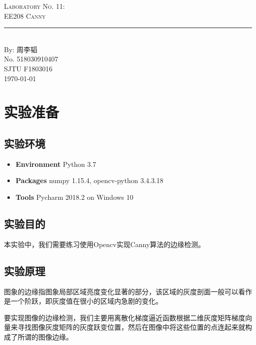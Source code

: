 \documentclass{article}
\newcommand{\labno}{11}
\newcommand{\labtitle}{EE208 Canny}
\newcommand{\authorname}{周李韬}
\newcommand{\studentno}{518030910407}
\newcommand{\classno}{F1803016}
\begin{document}
\begin{center}
{\LARGE \textsc{Laboratory No. \labno:} \\ \vspace{4pt}}
{\Large \textsc{\labtitle} \\ \vspace{4pt}} 
\rule[13pt]{\textwidth}{1pt} \\ \vspace{15pt}
{\large By: \authorname \\ \vspace{10pt}
No. \studentno \\ \vspace{10pt}
SJTU \classno \\ \vspace{10pt}
\today \vspace{20pt}}
\end{center}



\section{实验准备}

\subsection{实验环境}
\begin{itemize}
\item\textbf{Environment} Python 3.7
\item\textbf{Packages} numpy 1.15.4, opencv-python 3.4.3.18
\item\textbf{Tools} Pycharm 2018.2 on Windows 10
\end{itemize}

\subsection{实验目的}

本实验中，我们需要练习使用Opencv实现Canny算法的边缘检测。

\subsection{实验原理}

图象的边缘指图象局部区域亮度变化显著的部分，该区域的灰度剖面一般可以看作是一个阶跃，即灰度值在很小的区域内急剧的变化。

要实现图像的边缘检测，我们主要用离散化梯度逼近函数根据二维灰度矩阵梯度向量来寻找图像灰度矩阵的灰度跃变位置，然后在图像中将这些位置的点连起来就构成了所谓的图像边缘。
\end{document}
